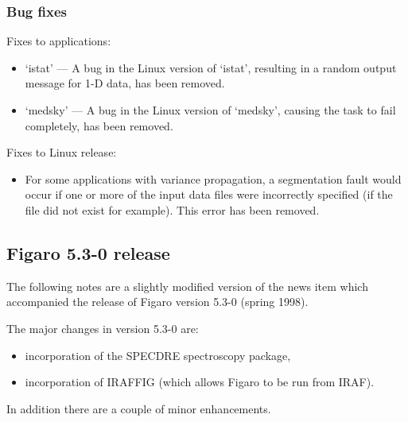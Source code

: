 \subsubsection{Bug fixes}

   Fixes to applications:

\begin{itemize}
\item `istat'  --- A bug in the Linux version of `istat', resulting
               in a random output message for 1-D data, has been
               removed.
\item `medsky' --- A bug in the Linux version of `medsky', causing the
               task to fail completely, has been removed.
\end{itemize}

   Fixes to Linux release:

\begin{itemize}
\item For some applications with variance propagation, a segmentation
      fault would occur if one or more of the input data files were
      incorrectly specified (if the file did not exist for example).
      This error has been removed.
\end{itemize}


\subsection{\label{news530}Figaro 5.3-0 release}

 The following notes are a slightly modified version of the news item
 which accompanied the release of Figaro version 5.3-0 (spring 1998).

 The major changes in version 5.3-0 are:

\begin{itemize}

  \item incorporation of the SPECDRE spectroscopy package,

  \item incorporation of IRAFFIG (which allows Figaro to be run from IRAF).

\end{itemize}

 In addition there are a couple of minor enhancements.

\vspace{5mm}

